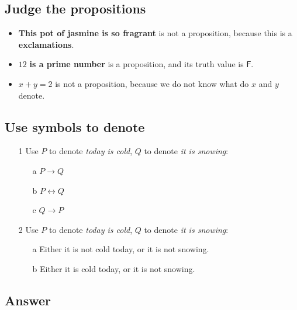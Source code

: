 \documentclass{article}
\begin{document}
\subsection{Judge the propositions}

\begin{itemize}
    \item \textbf{This pot of jasmine is so fragrant} is not a proposition, because this is a \textbf{exclamations}.
    
    \item $12$ \textbf{is a prime number} is a proposition, and its truth value is $\mathsf{F}$.

    \item $x+y=2$ is not a proposition, because we do not know what do $x$ and $y$ denote.
\end{itemize}

\subsection{Use symbols to denote}

\begin{itemize}
    \item[1] Use $P$ to denote \textit{today is cold}, $Q$ to denote \textit{it is snowing}:
        \begin{itemize}
            \item[a] $P\to Q$
            \item[b] $P\leftrightarrow Q$
            \item[c] $Q\to P$
        \end{itemize}

    \item[2] Use $P$ to denote \textit{today is cold}, $Q$ to denote \textit{it is snowing}:
        \begin{itemize}
            \item[a] Either it is not cold today, or it is not snowing.
            \item[b] Either it is cold today, or it is not snowing. 
        \end{itemize}
\end{itemize}

\subsection{Answer}
\end{document}
